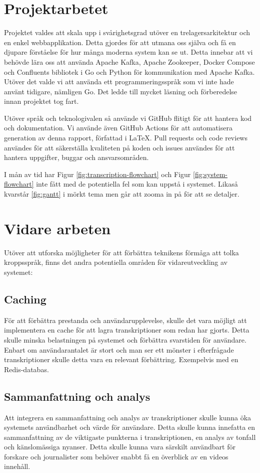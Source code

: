 \section{Projektarbetet}
Projektet valdes att skala upp i svårighetsgrad utöver en trelagersarkitektur
och en enkel webbapplikation. Detta gjordes för att utmana oss själva och
få en djupare förståelse för hur många moderna system kan se ut. Detta
innebar att vi behövde lära oss att använda Apache Kafka, Apache Zookeeper,
Docker Compose och Confluents \cite{Confluent2024} bibliotek i Go och Python
för kommunikation med Apache Kafka. Utöver det valde vi att använda ett
programmeringsspråk som vi inte hade använt tidigare, nämligen Go. Det ledde
till mycket läsning och förberedelse innan projektet tog fart. 

Utöver språk och teknologivalen så använde vi GitHub flitigt för att
hantera kod och dokumentation. Vi använde även GitHub Actions för att
automatisera generation av denna rapport, författad i \LaTeX. Pull requests
och code reviews användes för att säkerställa kvaliteten på koden och issues
användes för att hantera uppgifter, buggar och ansvarsområden.

I mån av tid har Figur \ref{fig:transcription-flowchart} och Figur 
\ref{fig:system-flowchart} inte fått med de potentiella fel som kan uppstå
i systemet. Likaså kvarstår \ref{fig:gantt} i mörkt tema men går att zooma in
på för att se detaljer.

\section{Vidare arbeten}
Utöver att utforska möjligheter för att förbättra teknikens förmåga att tolka
kroppsspråk, finns det andra potentiella områden för vidareutveckling av
systemet:

\subsection{Caching}
För att förbättra prestanda och användarupplevelse, skulle det vara möjligt
att implementera en cache för att lagra transkriptioner som redan har gjorts.
Detta skulle minska belastningen på systemet och förbättra svarstiden för
användare. Enbart om användarantalet är stort och man ser ett mönster i
efterfrågade transkriptioner skulle detta vara en relevant förbättring. 
Exempelvis med en Redis-databas. 

\subsection{Sammanfattning och analys}
Att integrera en sammanfattning och analys av transkriptioner skulle kunna
öka systemets användbarhet och värde för användare. Detta skulle kunna
innefatta en sammanfattning av de viktigaste punkterna i transkriptionen, en
analys av tonfall och känslomässiga nyanser. Detta skulle kunna vara särskilt
användbart för forskare och journalister som behöver snabbt få en överblick av
en videos innehåll.

